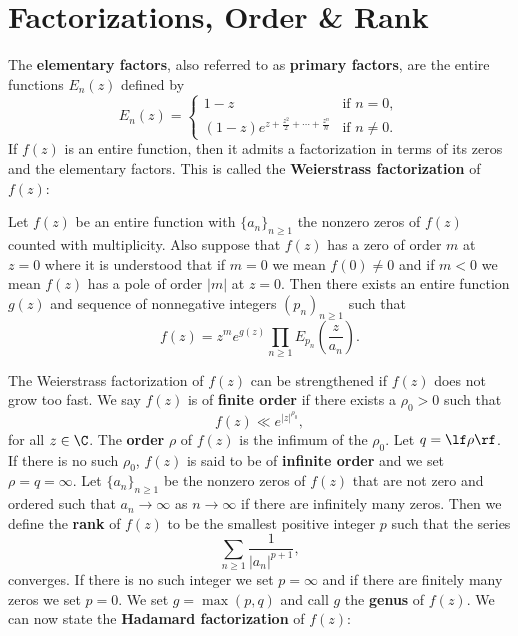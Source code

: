   \section{Factorizations, Order \& Rank}\label{append:Factorizations_and_Finite_Order}
    The \textbf{elementary factors}, also referred to as \textbf{primary factors}, are the entire functions $E_{n}(z)$ defined by
    \[
      E_{n}(z) = \begin{cases} 1-z & \text{if } n = 0, \\ (1-z)e^{z+\frac{z^{2}}{2}+\cdots+\frac{z^{n}}{n}} & \text{if } n \neq 0. \end{cases}
    \]
    If $f(z)$ is an entire function, then it admits a factorization in terms of its zeros and the elementary factors. This is called the \textbf{Weierstrass factorization} of $f(z)$:

    \begin{theorem}
      Let $f(z)$ be an entire function with $\{a_{n}\}_{n \ge 1}$ the nonzero zeros of $f(z)$ counted with multiplicity. Also suppose that $f(z)$ has a zero of order $m$ at $z = 0$ where it is understood that if $m = 0$ we mean $f(0) \neq 0$ and if $m < 0$ we mean $f(z)$ has a pole of order $|m|$ at $z = 0$. Then there exists an entire function $g(z)$ and sequence of nonnegative integers $(p_{n})_{n \ge 1}$ such that
      \[
        f(z) = z^{m}e^{g(z)}\prod_{n \ge 1}E_{p_{n}}\left(\frac{z}{a_{n}}\right).
      \]
    \end{theorem}

    The Weierstrass factorization of $f(z)$ can be strengthened if $f(z)$ does not grow too fast. We say $f(z)$ is of \textbf{finite order} if there exists a $\rho_{0} > 0$ such that
    \[
      f(z) \ll e^{|z|^{\rho_{0}}},
    \]
    for all $z \in \C$. The \textbf{order} $\rho$ of $f(z)$ is the infimum of the $\rho_{0}$. Let $q = \lf \rho \rf$. If there is no such $\rho_{0}$, $f(z)$ is said to be of \textbf{infinite order} and we set $\rho = q = \infty$. Let $\{a_{n}\}_{n \ge 1}$ be the nonzero zeros of $f(z)$ that are not zero and ordered such that $a_{n} \to \infty$ as $n \to \infty$ if there are infinitely many zeros. Then we define the \textbf{rank} of $f(z)$ to be the smallest positive integer $p$ such that the series
    \[
      \sum_{n \ge 1}\frac{1}{|a_{n}|^{p+1}},
    \]
    converges. If there is no such integer we set $p = \infty$ and if there are finitely many zeros we set $p = 0$. We set $g = \max(p,q)$ and call $g$ the \textbf{genus} of $f(z)$. We can now state the \textbf{Hadamard factorization} of $f(z)$:

